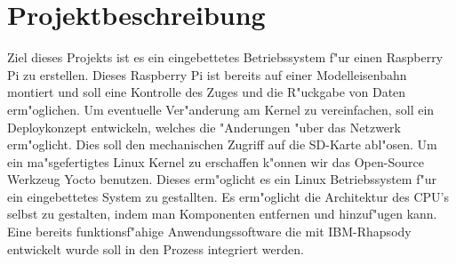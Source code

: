 \documentclass{article}
\begin{document}
	\section{Projektbeschreibung}
Ziel dieses Projekts ist es ein eingebettetes Betriebssystem f"ur einen Raspberry Pi zu erstellen. Dieses Raspberry Pi ist bereits auf einer Modelleisenbahn montiert und soll eine Kontrolle des Zuges und die R"uckgabe von Daten erm"oglichen.
Um eventuelle Ver"anderung am Kernel zu vereinfachen, soll ein Deploykonzept entwickeln, welches die "Anderungen "uber das Netzwerk erm"oglicht. Dies soll den mechanischen Zugriff auf die SD-Karte abl"osen.
Um ein ma"sgefertigtes Linux Kernel zu erschaffen k"onnen wir das Open-Source Werkzeug Yocto benutzen. Dieses erm"oglicht es ein Linux Betriebssystem f"ur ein eingebettetes System zu gestallten. Es erm"oglicht die Architektur des CPU's selbst zu gestalten, indem man Komponenten entfernen und hinzuf"ugen kann.
Eine bereits funktionsf"ahige Anwendungssoftware die mit IBM-Rhapsody entwickelt wurde soll in den Prozess integriert werden.
\end{document}
